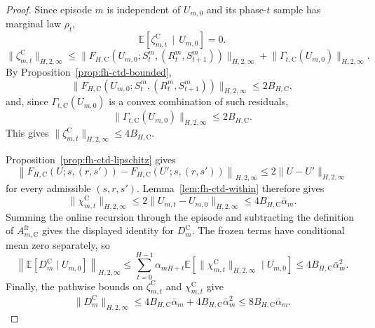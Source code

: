 \documentclass{article}
\begin{document}
\begin{proof}
Since episode $m$ is independent of $U_{m,0}$ and its phase-$t$ sample has marginal law $\rho_t$,
\begin{equation}
\mathbb E\left[\zeta_{m,t}^{\mathrm C}\,\mid\,U_{m,0}\right]=0.
\end{equation}
\begin{equation}
\lVert \zeta_{m,t}^{\mathrm C} \rVert_{H,2,\infty} \le \lVert F_{H,\mathrm C}(U_{m,0};S_t^m,(R_t^m,S_{t+1}^m)) \rVert_{H,2,\infty} + \lVert \Gamma_{t,\mathrm C}(U_{m,0}) \rVert_{H,2,\infty}.
\end{equation}
By Proposition~\ref{prop:fh-ctd-bounded},
\begin{equation}
\lVert F_{H,\mathrm C}(U_{m,0};S_t^m,(R_t^m,S_{t+1}^m)) \rVert_{H,2,\infty} \le 2B_{H,\mathrm C},
\end{equation}
and, since $\Gamma_{t,\mathrm C}(U_{m,0})$ is a convex combination of such residuals,
\begin{equation}
\lVert \Gamma_{t,\mathrm C}(U_{m,0}) \rVert_{H,2,\infty} \le 2B_{H,\mathrm C}.
\end{equation}
This gives $\lVert \zeta_{m,t}^{\mathrm C} \rVert_{H,2,\infty} \le 4B_{H,\mathrm C}$.

Proposition~\ref{prop:fh-ctd-lipschitz} gives
\begin{equation}
\left\lVert F_{H,\mathrm C}(U;s,(r,s')) - F_{H,\mathrm C}(U';s,(r,s')) \right\rVert_{H,2,\infty} \le 2\lVert U-U' \rVert_{H,2,\infty}
\end{equation}
for every admissible $(s,r,s')$. Lemma~\ref{lem:fh-ctd-within} therefore gives
\begin{equation}
\lVert\chi_{m,t}^{\mathrm C}\rVert_{H,2,\infty}\le2\lVert U_{m,t}-U_{m,0}\rVert_{H,2,\infty}\le4B_{H,\mathrm C}\bar\alpha_m.
\end{equation}
Summing the online recursion through the episode and subtracting the definition of $A_{m,\mathrm C}^{\mathrm{fr}}$ gives the displayed identity for $D_m^{\mathrm C}$. The frozen terms have conditional mean zero separately, so
\begin{equation}
\left\lVert\mathbb E\left[D_m^{\mathrm C}\mid U_{m,0}\right]\right\rVert_{H,2,\infty}\le\sum_{t=0}^{H-1}\alpha_{mH+t}\mathbb E\left[\lVert\chi_{m,t}^{\mathrm C}\rVert_{H,2,\infty}\mid U_{m,0}\right]\le4B_{H,\mathrm C}\bar\alpha_m^2.
\end{equation}
Finally, the pathwise bounds on $\zeta_{m,t}^{\mathrm C}$ and $\chi_{m,t}^{\mathrm C}$ give
\begin{equation}
\lVert D_m^{\mathrm C}\rVert_{H,2,\infty}\le4B_{H,\mathrm C}\bar\alpha_m+4B_{H,\mathrm C}\bar\alpha_m^2\le8B_{H,\mathrm C}\bar\alpha_m.
\end{equation}
\end{proof}
\end{document}
